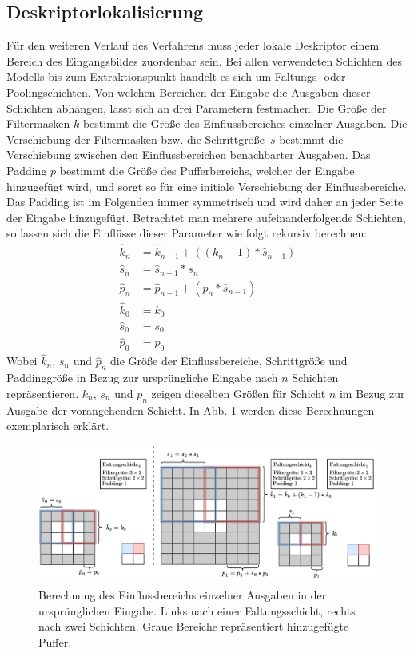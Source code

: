 \subsection{Deskriptorlokalisierung}\label{rf_chapter}
Für den weiteren Verlauf des Verfahrens muss jeder lokale Deskriptor einem Bereich des Eingangsbildes zuordenbar sein. Bei allen verwendeten Schichten des Modells bis zum Extraktionspunkt handelt es sich um Faltungs- oder Poolingschichten. Von welchen Bereichen der Eingabe die Ausgaben dieser Schichten abhängen, lässt sich an drei Parametern festmachen. Die Größe der Filtermasken $k$ bestimmt die Größe des Einflussbereiches einzelner Ausgaben. Die Verschiebung der Filtermasken bzw. die Schrittgröße~$s$ bestimmt die Verschiebung zwischen den Einflussbereichen benachbarter Ausgaben. Das Padding $p$ bestimmt die Größe des Pufferbereichs, welcher der Eingabe hinzugefügt wird, und sorgt so für eine initiale Verschiebung der Einflussbereiche. Das Padding ist im Folgenden immer symmetrisch und wird daher an jeder Seite der Eingabe hinzugefügt. Betrachtet man mehrere aufeinanderfolgende Schichten, so lassen sich die Einflüsse dieser Parameter wie folgt rekursiv berechnen:
\begin{align}
\hat{k}_n &= \hat{k}_{n-1} + ((k_n - 1) * \hat{s}_{n-1})
\\
\hat{s}_n &= \hat{s}_{n-1} * s_n
\\
\hat{p}_n &= \hat{p}_{n-1} + (p_n * \hat{s}_{n-1})
\\
\hat{k}_0 &= k_0
\\
\hat{s}_0 &= s_0
\\
\hat{p}_0 &= p_0
\end{align}
Wobei $\hat{k}_n$, $\hat{s}_n$ und $\hat{p}_n$ die Größe der Einflussbereiche, Schrittgröße und Paddinggröße in Bezug zur ursprüngliche Eingabe nach $n$ Schichten repräsentieren. $k_n$, $s_n$ und $p_n$ zeigen dieselben Größen für Schicht $n$ im Bezug zur Ausgabe der vorangehenden Schicht. In Abb. \ref{receptive_field} werden diese Berechnungen exemplarisch erklärt.
\begin{figure}[h]
\centering
\includegraphics[scale=0.51]{rf.pdf}
\caption{Berechnung des Einflussbereichs einzelner Ausgaben in der ursprünglichen Eingabe. Links nach einer Faltungsschicht, rechts nach zwei Schichten. Graue Bereiche repräsentiert hinzugefügte Puffer.}
\label{receptive_field}
\end{figure}
